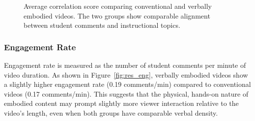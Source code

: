 \documentclass[fleqn,10pt]{JLA_article} %
\begin{document}
\begin{figure}[h!]
    \centering
    \caption{Average correlation score comparing conventional and verbally embodied videos. The two groups show comparable alignment between student comments and instructional topics.}
    \label{fig:res_corr}
\end{figure}

\subsubsection{Engagement Rate}
Engagement rate is measured as the number of student comments per minute of video duration. As shown in Figure~\ref{fig:res_eng}, verbally embodied videos show a slightly higher engagement rate (0.19 comments/min) compared to conventional videos (0.17 comments/min). This suggests that the physical, hands-on nature of embodied content may prompt slightly more viewer interaction relative to the video's length, even when both groups have comparable verbal density.
\end{document}
